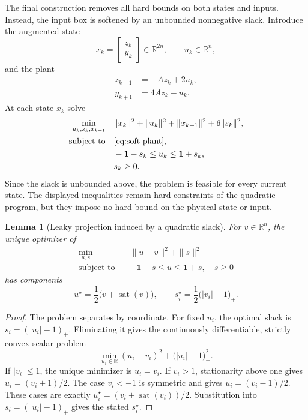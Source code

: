 \documentclass{IEEEtran}
\newtheorem{lemma}[theorem]{Lemma}
\theoremstyle{remark}
\newcommand{\R}{\mathbb{R}}
\newcommand{\sat}{\operatorname{sat}}
\begin{document}
The final construction removes all hard bounds on both states and inputs.  Instead, the input box is softened by an unbounded nonnegative slack.  Introduce the augmented state
\[
  x_k=\begin{bmatrix}z_k\\y_k\end{bmatrix}\in\R^{2n},
  \qquad u_k\in\R^n,
\]
and the plant
\begin{subequations}
\label{eq:soft-plant}
\begin{align}
  z_{k+1}&=-Az_k+2u_k,\\
  y_{k+1}&=4Az_k-u_k.
\end{align}
\end{subequations}
At each state $x_k$ solve
\begin{subequations}
\label{eq:soft-mpc}
\begin{align}
  \min_{u_k,s_k,x_{k+1}}\quad
  &\|x_k\|^2+\|u_k\|^2+\|x_{k+1}\|^2+6\|s_k\|^2,\\
  \text{subject to}\quad
  &\eqref{eq:soft-plant},\\
  &-\mathbf 1-s_k\le u_k\le \mathbf 1+s_k,\\
  &s_k\ge0.
\end{align}
\end{subequations}
Since the slack is unbounded above, the problem is feasible for every current state.  The displayed inequalities remain hard constraints of the quadratic program, but they impose no hard bound on the physical state or input.

\begin{lemma}[Leaky projection induced by a quadratic slack]
\label{lem:leaky}
For $v\in\R^n$, the unique optimizer of
\begin{equation}
\label{eq:leaky-problem}
\begin{aligned}
  \min_{u,s}\quad &\|u-v\|^2+\|s\|^2\\
  \text{subject to}\quad
  &-\mathbf 1-s\le u\le\mathbf 1+s,\quad s\ge0
\end{aligned}
\end{equation}
has components
\[
  u^\star=\frac12\bigl(v+\sat(v)\bigr),
  \qquad
  s_i^\star=\frac12\bigl(|v_i|-1\bigr)_+.
\]
\end{lemma}

\begin{proof}
The problem separates by coordinate.  For fixed $u_i$, the optimal slack is
$s_i=(|u_i|-1)_+$.  Eliminating it gives the continuously differentiable,
strictly convex scalar problem
\[
  \min_{u_i\in\R}
  (u_i-v_i)^2+\bigl(|u_i|-1\bigr)_+^2.
\]
If $|v_i|\le1$, the unique minimizer is $u_i=v_i$.  If $v_i>1$, stationarity above one gives $u_i=(v_i+1)/2$.  The case $v_i<-1$ is symmetric and gives $u_i=(v_i-1)/2$.  These cases are exactly $u_i^\star=(v_i+\sat(v_i))/2$.  Substitution into $s_i=(|u_i|-1)_+$ gives the stated $s_i^\star$.
\end{proof}
\end{document}
